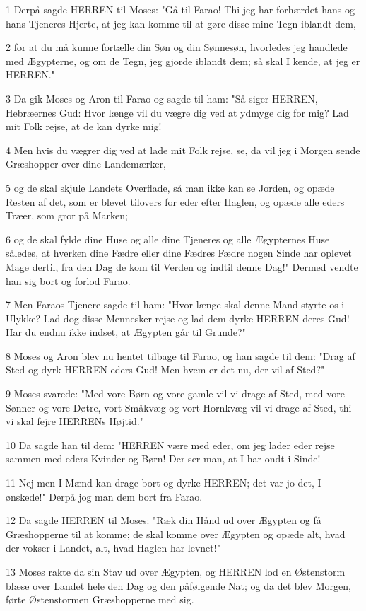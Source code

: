 \par 1 Derpå sagde HERREN til Moses: "Gå til Farao! Thi jeg har forhærdet hans og hans Tjeneres Hjerte, at jeg kan komme til at gøre disse mine Tegn iblandt dem,
\par 2 for at du må kunne fortælle din Søn og din Sønnesøn, hvorledes jeg handlede med Ægypterne, og om de Tegn, jeg gjorde iblandt dem; så skal I kende, at jeg er HERREN."
\par 3 Da gik Moses og Aron til Farao og sagde til ham: "Så siger HERREN, Hebræernes Gud: Hvor længe vil du vægre dig ved at ydmyge dig for mig? Lad mit Folk rejse, at de kan dyrke mig!
\par 4 Men hvis du vægrer dig ved at lade mit Folk rejse, se, da vil jeg i Morgen sende Græshopper over dine Landemærker,
\par 5 og de skal skjule Landets Overflade, så man ikke kan se Jorden, og opæde Resten af det, som er blevet tilovers for eder efter Haglen, og opæde alle eders Træer, som gror på Marken;
\par 6 og de skal fylde dine Huse og alle dine Tjeneres og alle Ægypternes Huse således, at hverken dine Fædre eller dine Fædres Fædre nogen Sinde har oplevet Mage dertil, fra den Dag de kom til Verden og indtil denne Dag!" Dermed vendte han sig bort og forlod Farao.
\par 7 Men Faraos Tjenere sagde til ham: "Hvor længe skal denne Mand styrte os i Ulykke? Lad dog disse Mennesker rejse og lad dem dyrke HERREN deres Gud! Har du endnu ikke indset, at Ægypten går til Grunde?"
\par 8 Moses og Aron blev nu hentet tilbage til Farao, og han sagde til dem: "Drag af Sted og dyrk HERREN eders Gud! Men hvem er det nu, der vil af Sted?"
\par 9 Moses svarede: "Med vore Børn og vore gamle vil vi drage af Sted, med vore Sønner og vore Døtre, vort Småkvæg og vort Hornkvæg vil vi drage af Sted, thi vi skal fejre HERRENs Højtid."
\par 10 Da sagde han til dem: "HERREN være med eder, om jeg lader eder rejse sammen med eders Kvinder og Børn! Der ser man, at I har ondt i Sinde!
\par 11 Nej men I Mænd kan drage bort og dyrke HERREN; det var jo det, I ønskede!" Derpå jog man dem bort fra Farao.
\par 12 Da sagde HERREN til Moses: "Ræk din Hånd ud over Ægypten og få Græshopperne til at komme; de skal komme over Ægypten og opæde alt, hvad der vokser i Landet, alt, hvad Haglen har levnet!"
\par 13 Moses rakte da sin Stav ud over Ægypten, og HERREN lod en Østenstorm blæse over Landet hele den Dag og den påfølgende Nat; og da det blev Morgen, førte Østenstormen Græshopperne med sig.
